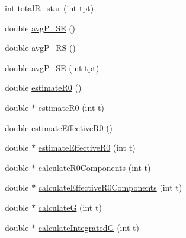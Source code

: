 \begin{DoxyCompactItemize}
\item 
int \hyperlink{classSpatialSEIR_1_1ModelContext_a5b486f6b0c97d26d106dffd007c1b515}{total\-R\-\_\-star} (int tpt)
\item 
double \hyperlink{classSpatialSEIR_1_1ModelContext_af1258e6c426000d483ac4a06220281a7}{avg\-P\-\_\-\-S\-E} ()
\item 
double \hyperlink{classSpatialSEIR_1_1ModelContext_a6c76f5d9d10b7dca77e02a8304f26203}{avg\-P\-\_\-\-R\-S} ()
\item 
double \hyperlink{classSpatialSEIR_1_1ModelContext_a9cb6ca074aff51c1f789b81111c7e153}{avg\-P\-\_\-\-S\-E} (int tpt)
\item 
double \hyperlink{classSpatialSEIR_1_1ModelContext_aa450557786a891db5bb3338a047b1544}{estimate\-R0} ()
\item 
double $\ast$ \hyperlink{classSpatialSEIR_1_1ModelContext_a950c26a1969e4785b3e3d5bbc9a3f082}{estimate\-R0} (int t)
\item 
double \hyperlink{classSpatialSEIR_1_1ModelContext_a55531781c4053d4ec61f2ecb81689c6d}{estimate\-Effective\-R0} ()
\item 
double $\ast$ \hyperlink{classSpatialSEIR_1_1ModelContext_ab950a7d14042e0383197c3fac906b5bd}{estimate\-Effective\-R0} (int t)
\item 
double $\ast$ \hyperlink{classSpatialSEIR_1_1ModelContext_a4a1e958b01b2d09df92abe698eec6ec5}{calculate\-R0\-Components} (int t)
\item 
double $\ast$ \hyperlink{classSpatialSEIR_1_1ModelContext_a522336043faa876bb47494f409082b34}{calculate\-Effective\-R0\-Components} (int t)
\item 
double $\ast$ \hyperlink{classSpatialSEIR_1_1ModelContext_a26650599b445d706e833ad33bbc4ad71}{calculate\-G} (int t)
\item 
double $\ast$ \hyperlink{classSpatialSEIR_1_1ModelContext_a637ceadc71ad656202e3d3fa21d01ade}{calculate\-Integrated\-G} (int t)
\end{DoxyCompactItemize}
